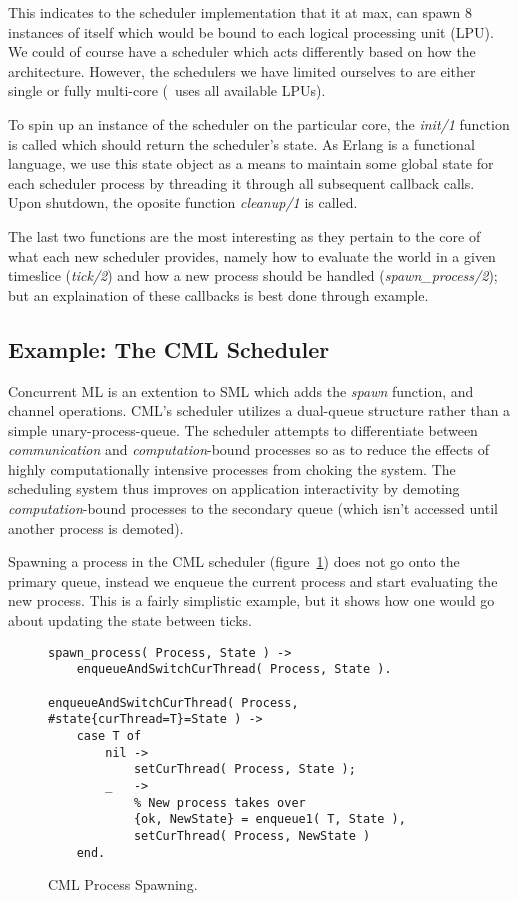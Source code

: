 \noindent
This indicates to the scheduler implementation that it at max, can spawn $8$
instances of itself which would be bound to each logical processing unit (LPU).
We could of course have a scheduler which acts differently based on how the
architecture. However, the schedulers we have limited ourselves to are either
single or fully multi-core (\ie~uses all available LPUs).

To spin up an instance of the scheduler on the particular core, the 
\emph{init/1} function is called which should return the scheduler's state. 
As Erlang is a functional language, we use this state object as a means to
maintain some global state for each scheduler process by threading it through
all subsequent callback calls. Upon shutdown, the oposite function 
\emph{cleanup/1} is called.

The last two functions are the most interesting as they pertain to the core of
what each new scheduler provides, namely how to evaluate the world in a given
timeslice (\emph{tick/2}) and how a new process should be handled 
(\emph{spawn\_process/2}); but an explaination of these callbacks is best done 
through example.

\subsection{Example: The CML Scheduler}\label{sec:example the cml scheduler}

Concurrent ML is an extention to SML which adds the \emph{spawn} function, and 
channel operations. CML's scheduler utilizes a dual-queue structure rather than
a simple unary-process-queue. The scheduler attempts to differentiate between
{\em communication} and {\em computation}-bound processes so as to reduce the
effects of highly computationally intensive processes from choking the system.
The scheduling system thus improves on application interactivity by demoting 
{\em computation}-bound processes to the secondary queue (which isn't accessed
until another process is demoted).

Spawning a process in the CML scheduler (figure~\ref{fig:cml-spawn-process}) 
does not go onto the primary queue, instead we enqueue the current process and 
start evaluating the new process. This is a fairly simplistic example, but it 
shows how one would go about updating the state between ticks.

\begin{figure}
\begin{verbatim}
spawn_process( Process, State ) -> 
    enqueueAndSwitchCurThread( Process, State ).

enqueueAndSwitchCurThread( Process, #state{curThread=T}=State ) ->
    case T of
        nil ->
            setCurThread( Process, State );
        _   ->
            % New process takes over
            {ok, NewState} = enqueue1( T, State ), 
            setCurThread( Process, NewState )
    end.
\end{verbatim}
\caption{CML Process Spawning.}
\label{fig:cml-spawn-process}
\end{figure}

